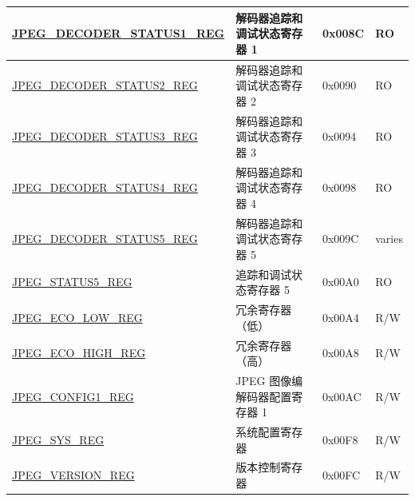 \begin{longtable}{ | p{6cm} | p{7.2cm} | p{1.3cm} | p{1cm} | }
\hyperref[regdesc:JPEGDECODERSTATUS1REG]{JPEG\_DECODER\_STATUS1\_REG} & 解码器追踪和调试状态寄存器 1 & 0x008C & RO \\ \hline
\hyperref[regdesc:JPEGDECODERSTATUS2REG]{JPEG\_DECODER\_STATUS2\_REG} & 解码器追踪和调试状态寄存器 2 & 0x0090 & RO \\ \hline
\hyperref[regdesc:JPEGDECODERSTATUS3REG]{JPEG\_DECODER\_STATUS3\_REG} & 解码器追踪和调试状态寄存器 3 & 0x0094 & RO \\ \hline
\hyperref[regdesc:JPEGDECODERSTATUS4REG]{JPEG\_DECODER\_STATUS4\_REG} & 解码器追踪和调试状态寄存器 4 & 0x0098 & RO \\ \hline
\hyperref[regdesc:JPEGDECODERSTATUS5REG]{JPEG\_DECODER\_STATUS5\_REG} & 解码器追踪和调试状态寄存器 5 & 0x009C & varies \\ \hline
\hyperref[regdesc:JPEGSTATUS5REG]{JPEG\_STATUS5\_REG} & 追踪和调试状态寄存器 5 & 0x00A0 & RO \\ \hline
\hyperref[regdesc:JPEGECOLOWREG]{JPEG\_ECO\_LOW\_REG} & 冗余寄存器（低） & 0x00A4 & R/W \\ \hline
\hyperref[regdesc:JPEGECOHIGHREG]{JPEG\_ECO\_HIGH\_REG} & 冗余寄存器（高） & 0x00A8 & R/W \\ \hline
\hyperref[regdesc:JPEGCONFIG1REG]{JPEG\_CONFIG1\_REG} & JPEG 图像编解码器配置寄存器 1 & 0x00AC & R/W \\ \hline
\hyperref[regdesc:JPEGSYSREG]{JPEG\_SYS\_REG} & 系统配置寄存器 & 0x00F8 & R/W \\ \hline
\hyperref[regdesc:JPEGVERSIONREG]{JPEG\_VERSION\_REG} & 版本控制寄存器 & 0x00FC & R/W \\ \hline
\end{longtable}
